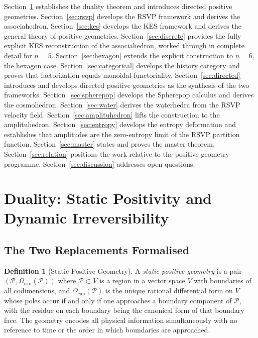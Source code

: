 \documentclass[12pt, oneside]{amsart}
\theoremstyle{plain}
\theoremstyle{definition}
\newtheorem{definition}[theorem]{Definition}
\theoremstyle{remark}
\newcommand{\CF}{\Omega_{\mathrm{can}}}
\begin{document}
Section~\ref{sec:duality} establishes the duality theorem and introduces directed positive geometries. Section~\ref{sec:rsvp} develops the RSVP framework and derives the associahedron. Section~\ref{sec:kes} develops the KES framework and derives the general theory of positive geometries. Section~\ref{sec:discrete} provides the fully explicit KES reconstruction of the associahedron, worked through in complete detail for $n=5$. Section~\ref{sec:hexagon} extends the explicit construction to $n=6$, the hexagon case. Section~\ref{sec:categorical} develops the history category and proves that factorization equals monoidal functoriality. Section~\ref{sec:directed} introduces and develops directed positive geometries as the synthesis of the two frameworks. Section~\ref{sec:spherepop} develops the Spherepop calculus and derives the cosmohedron. Section~\ref{sec:water} derives the waterhedra from the RSVP velocity field. Section~\ref{sec:amplituhedron} lifts the construction to the amplituhedron. Section~\ref{sec:entropy} develops the entropy deformation and establishes that amplitudes are the zero-entropy limit of the RSVP partition function. Section~\ref{sec:master} states and proves the master theorem. Section~\ref{sec:relation} positions the work relative to the positive geometry programme. Section~\ref{sec:discussion} addresses open questions.

\section{Duality: Static Positivity and Dynamic Irreversibility}
\label{sec:duality}

\subsection{The Two Replacements Formalised}

\begin{definition}[Static Positive Geometry]
A \emph{static positive geometry} is a pair $(\mathcal{P}, \CF(\mathcal{P}))$ where $\mathcal{P} \subset V$ is a region in a vector space $V$ with boundaries of all codimensions, and $\CF(\mathcal{P})$ is the unique rational differential form on $V$ whose poles occur if and only if one approaches a boundary component of $\mathcal{P}$, with the residue on each boundary being the canonical form of that boundary face. The geometry encodes all physical information simultaneously with no reference to time or the order in which boundaries are approached.
\end{definition}
\end{document}
